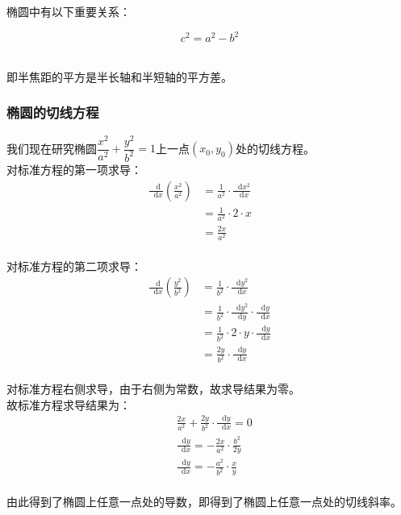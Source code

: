 \documentclass[UTF8]{ctexart}
\newcommand*{\dif}{\mathop{}\!\mathrm{d}}
\begin{document}
    椭圆中有以下重要关系：
    \begin{large}
        \begin{equation*}
            c^2=a^2-b^2
        \end{equation*}
    \end{large}\\
    即半焦距的平方是半长轴和半短轴的平方差。

\newpage

\subsubsection{椭圆的切线方程}
    我们现在研究椭圆$\dfrac{x^2}{a^2}+\dfrac{y^2}{b^2}=1$上一点$(x_0,y_0)$处的切线方程。\\[5mm]
    对标准方程的第一项求导：
    \setcounter{equation}{0}
    \begin{align}
        \frac{\dif}{\dif x}\left(\frac{x^2}{a^2}\right)
        &=\frac{1}{a^2}\cdot\frac{\dif x^2}{\dif x}~~~~~~~~\\[4mm]
        &=\frac{1}{a^2}\cdot 2\cdot x\\[4mm]
        &=\frac{2x}{a^2}
    \end{align}\\
    对标准方程的第二项求导：
    \setcounter{equation}{0}
    \begin{align}
        \frac{\dif}{\dif x}\left(\frac{y^2}{b^2}\right)
        &=\frac{1}{b^2}\cdot\frac{\dif y^2}{\dif x}\\[4mm]
        &=\frac{1}{b^2}\cdot\frac{\dif y^2}{\dif y}\cdot\frac{\dif y}{\dif x}\\[4mm]
        &=\frac{1}{b^2}\cdot 2\cdot y\cdot \frac{\dif y}{\dif x}\\[4mm]
        &=\frac{2y}{b^2}\cdot\frac{\dif y}{\dif x}
    \end{align}\\
    对标准方程右侧求导，由于右侧为常数，故求导结果为零。\\[12mm]
    故标准方程求导结果为：
    \begin{align}
        &\frac{2x}{a^2}+\frac{2y}{b^2}\cdot\frac{\dif y}{\dif x}=0\\[5mm]
        &\frac{\dif y}{\dif x}=-\frac{2x}{a^2}\cdot\frac{b^2}{2y}\\[5mm]
        &\frac{\dif y}{\dif x}=-\frac{a^2}{b^2}\cdot\frac{x}{y}
    \end{align}\\
    由此得到了椭圆上任意一点处的导数，即得到了椭圆上任意一点处的切线斜率。
\end{document}
